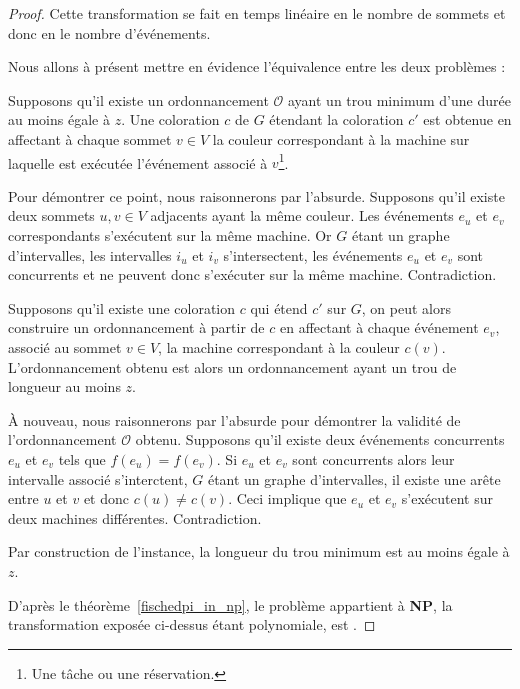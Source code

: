 \documentclass[a4paper,9pt]{book}
\begin{document}
\begin{proof}
    Cette transformation se fait en temps linéaire en le nombre de sommets et donc en le nombre
    d'événements.

    Nous allons à présent mettre en évidence l'équivalence entre les deux problèmes :
    \begin{bitemize}
        \item Supposons qu'il existe un ordonnancement $\mathcal{O}$ ayant un trou minimum d'une durée au
            moins égale à $z$. Une coloration $c$ de $G$ étendant la coloration $c'$ est obtenue en
            affectant à chaque sommet $v \in V$ la couleur correspondant à la machine
            sur laquelle est exécutée l'événement associé à $v$\footnote{Une tâche ou une
            réservation.}.
            
            Pour démontrer ce point, nous raisonnerons par l'absurde. Supposons qu'il existe deux
            sommets $u, v \in V$ adjacents ayant la même couleur. Les événements $e_u$ et $e_v$
            correspondants s'exécutent sur la même machine. Or $G$ étant un graphe d'intervalles,
            les intervalles $i_u$ et $i_v$ s'intersectent, les événements $e_u$ et $e_v$ sont
            concurrents et ne peuvent donc s'exécuter sur la même machine. Contradiction.

        \item Supposons qu'il existe une coloration $c$ qui étend $c'$ sur $G$, on peut alors
            construire un ordonnancement à partir de $c$ en affectant à chaque événement $e_v$,
            associé au sommet $v \in V$, la machine correspondant à la couleur $c(v)$.
            L'ordonnancement obtenu est alors un ordonnancement ayant un trou de longueur au moins
            $z$.

            À nouveau, nous raisonnerons par l'absurde pour démontrer la validité de
            l'ordonnancement $\mathcal{O}$ obtenu. Supposons qu'il existe deux événements
            concurrents $e_u$ et $e_v$ tels que $f(e_u) = f(e_v)$. Si $e_u$ et $e_v$ sont
            concurrents alors leur intervalle associé s'interctent, $G$ étant un graphe
            d'intervalles, il existe une arête entre $u$ et $v$ et donc $c(u) \neq c(v)$. Ceci
            implique que $e_u$ et $e_v$ s'exécutent sur deux machines différentes. Contradiction.

            Par construction de l'instance, la longueur du trou minimum est au moins égale à $z$.
    \end{bitemize}

    D'après le théorème~\ref{fischedpi_in_np}, le problème \fischedpi appartient à \textbf{NP}, la
    transformation exposée ci-dessus étant polynomiale, \fischedpi est \npc.
\end{proof}
\end{document}
